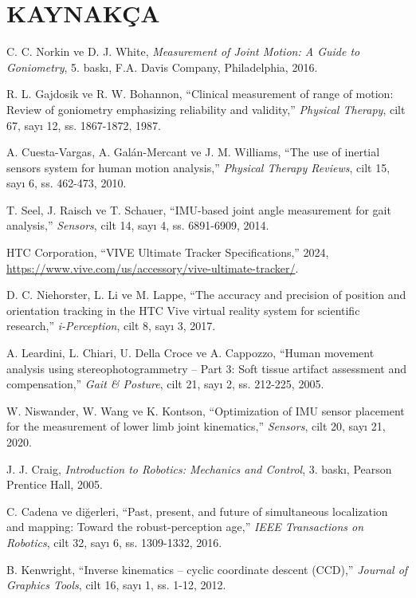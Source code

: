 \documentclass[12pt,a4paper,oneside]{report}
\begin{document}
\chapter{KAYNAKÇA}
\begin{enumerate}[label={[\arabic*]}, leftmargin=1.2cm]
\item C. C. Norkin ve D. J. White, \textit{Measurement of Joint Motion: A Guide to Goniometry}, 5. baskı, F.A. Davis Company, Philadelphia, 2016.
\item R. L. Gajdosik ve R. W. Bohannon, ``Clinical measurement of range of motion: Review of goniometry emphasizing reliability and validity,'' \textit{Physical Therapy}, cilt 67, sayı 12, ss. 1867-1872, 1987.
\item A. Cuesta-Vargas, A. Galán-Mercant ve J. M. Williams, ``The use of inertial sensors system for human motion analysis,'' \textit{Physical Therapy Reviews}, cilt 15, sayı 6, ss. 462-473, 2010.
\item T. Seel, J. Raisch ve T. Schauer, ``IMU-based joint angle measurement for gait analysis,'' \textit{Sensors}, cilt 14, sayı 4, ss. 6891-6909, 2014.
\item HTC Corporation, ``VIVE Ultimate Tracker Specifications,'' 2024, \url{https://www.vive.com/us/accessory/vive-ultimate-tracker/}.
\item D. C. Niehorster, L. Li ve M. Lappe, ``The accuracy and precision of position and orientation tracking in the HTC Vive virtual reality system for scientific research,'' \textit{i-Perception}, cilt 8, sayı 3, 2017.
\item A. Leardini, L. Chiari, U. Della Croce ve A. Cappozzo, ``Human movement analysis using stereophotogrammetry -- Part 3: Soft tissue artifact assessment and compensation,'' \textit{Gait \& Posture}, cilt 21, sayı 2, ss. 212-225, 2005.
\item W. Niswander, W. Wang ve K. Kontson, ``Optimization of IMU sensor placement for the measurement of lower limb joint kinematics,'' \textit{Sensors}, cilt 20, sayı 21, 2020.
\item J. J. Craig, \textit{Introduction to Robotics: Mechanics and Control}, 3. baskı, Pearson Prentice Hall, 2005.
\item C. Cadena ve diğerleri, ``Past, present, and future of simultaneous localization and mapping: Toward the robust-perception age,'' \textit{IEEE Transactions on Robotics}, cilt 32, sayı 6, ss. 1309-1332, 2016.
\item B. Kenwright, ``Inverse kinematics -- cyclic coordinate descent (CCD),'' \textit{Journal of Graphics Tools}, cilt 16, sayı 1, ss. 1-12, 2012.

\end{enumerate}
\end{document}
